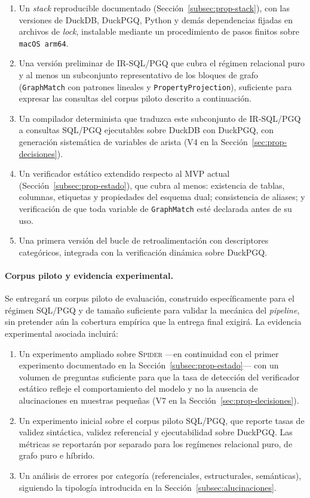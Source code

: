 \begin{enumerate}
    \item Un \emph{stack} reproducible documentado (Sección~\ref{subsec:prop-stack}), con las versiones de DuckDB, DuckPGQ, Python y demás dependencias fijadas en archivos de \emph{lock}, instalable mediante un procedimiento de pasos finitos sobre \texttt{macOS arm64}.
    \item Una versión preliminar de IR-SQL/PGQ que cubra el régimen relacional puro y al menos un subconjunto representativo de los bloques de grafo (\texttt{GraphMatch} con patrones lineales y \texttt{PropertyProjection}), suficiente para expresar las consultas del corpus piloto descrito a continuación.
    \item Un compilador determinista que traduzca este subconjunto de IR-SQL/PGQ a consultas \ac{SQL}/\ac{PGQ} ejecutables sobre DuckDB con DuckPGQ, con generación sistemática de variables de arista (V4 en la Sección~\ref{sec:prop-decisiones}).
    \item Un verificador estático extendido respecto al \ac{MVP} actual (Sección~\ref{subsec:prop-estado}), que cubra al menos: existencia de tablas, columnas, etiquetas y propiedades del esquema dual; consistencia de aliases; y verificación de que toda variable de \texttt{GraphMatch} esté declarada antes de su uso.
    \item Una primera versión del bucle de retroalimentación con descriptores categóricos, integrada con la verificación dinámica sobre DuckPGQ.
\end{enumerate}

\paragraph{Corpus piloto y evidencia experimental.} Se entregará un corpus piloto de evaluación, construido específicamente para el régimen \ac{SQL}/\ac{PGQ} y de tamaño suficiente para validar la mecánica del \emph{pipeline}, sin pretender aún la cobertura empírica que la entrega final exigirá. La evidencia experimental asociada incluirá:

\begin{enumerate}
    \item Un experimento ampliado sobre \textsc{Spider} ---en continuidad con el primer experimento documentado en la Sección~\ref{subsec:prop-estado}--- con un volumen de preguntas suficiente para que la tasa de detección del verificador estático refleje el comportamiento del modelo y no la ausencia de alucinaciones en muestras pequeñas (V7 en la Sección~\ref{sec:prop-decisiones}).
    \item Un experimento inicial sobre el corpus piloto \ac{SQL}/\ac{PGQ}, que reporte tasas de validez sintáctica, validez referencial y ejecutabilidad sobre DuckPGQ. Las métricas se reportarán por separado para los regímenes relacional puro, de grafo puro e híbrido.
    \item Un análisis de errores por categoría (referenciales, estructurales, semánticas), siguiendo la tipología introducida en la Sección~\ref{subsec:alucinaciones}.
\end{enumerate}

